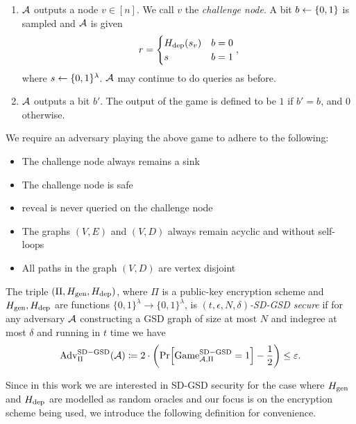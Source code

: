 \begin{definition}
\begin{enumerate}[1.]
\begin{itemize}
		      \end{itemize}
		\item $\mathcal{A}$ outputs a node $v \in [n]$. We call $v$ the \emph{challenge node}. A bit $b \leftarrow \{0, 1\}$ is sampled and $\mathcal{A}$ is given
		      \[
			      r = \begin{cases}
				      H_\mathrm{dep}(s_v) & b = 0 \\
				      s          & b = 1
			      \end{cases},
		      \]
		      where $s \leftarrow \{0, 1\}^\lambda$. $\mathcal{A}$ may continue to do queries as before.
		\item \label{def:sd-gsd-game-step-4} $\mathcal{A}$ outputs a bit $b'$. The output of the game is defined to be $1$ if $b' = b$, and $0$ otherwise.
	\end{enumerate}

	We require an adversary playing the above game to adhere to the following:
	\begin{itemize}
		\item The challenge node always remains a sink 
		\item The challenge node is safe
		\item $\mathrm{reveal}$ is never queried on the challenge node 
		\item The graphs $(V, E)$ and $(V, D)$ always remain acyclic and without self-loops
		\item All paths in the graph $(V, D)$ are vertex disjoint 
	\end{itemize}
\end{definition}


\begin{definition}
	The triple $(\Pi, H_\mathrm{gen}, H_\mathrm{dep})$, where $\Pi$ is a public-key encryption scheme and $H_\mathrm{gen}, H_\mathrm{dep}$ are functions $\{0, 1\}^\lambda \to \{0, 1\}^\lambda$, is \emph{$(t, \epsilon, N, \delta)$-SD-GSD secure} if for any adversary $\mathcal{A}$ constructing a GSD graph of size at most $N$ and indegree at most $\delta$ and running in $t$ time we have
	\begin{align*}
		\mathrm{Adv}_{\Pi}^{\mathrm{SD-GSD}}(\adv) \coloneqq 2 \cdot \left(\pr{\mathrm{Game}_{\adv, \Pi}^{\mathrm{SD-GSD}} = 1} - \frac{1}{2}\right) \le \epsilon.
	\end{align*}
\end{definition}

Since in this work we are interested in SD-GSD security for the case where $H_\mathrm{gen}$ and $H_\mathrm{dep}$ are modelled as random oracles and our focus is on the encryption scheme being used, we introduce the following definition for convenience.

